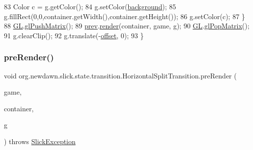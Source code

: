 \begin{DoxyCode}
83             Color c = g.getColor();
84             g.setColor(\mbox{\hyperlink{classorg_1_1newdawn_1_1slick_1_1state_1_1transition_1_1_horizontal_split_transition_a9f2e988c706773e93ad1472d85c5b229}{background}});
85             g.fillRect(0,0,container.getWidth(),container.getHeight());
86             g.setColor(c);
87         \}
88         \mbox{\hyperlink{classorg_1_1newdawn_1_1slick_1_1state_1_1transition_1_1_horizontal_split_transition_aaceecb1455b0610ec5366dda0247bcce}{GL}}.\mbox{\hyperlink{interfaceorg_1_1newdawn_1_1slick_1_1opengl_1_1renderer_1_1_s_g_l_ae9904a980aa014796bf1dcd748b63056}{glPushMatrix}}();
89         \mbox{\hyperlink{classorg_1_1newdawn_1_1slick_1_1state_1_1transition_1_1_horizontal_split_transition_a07a49cfa318899ffe21df13886c4f9f3}{prev}}.\mbox{\hyperlink{interfaceorg_1_1newdawn_1_1slick_1_1state_1_1_game_state_a065352d2725274c5244cd022f226eb17}{render}}(container, game, g);
90         \mbox{\hyperlink{classorg_1_1newdawn_1_1slick_1_1state_1_1transition_1_1_horizontal_split_transition_aaceecb1455b0610ec5366dda0247bcce}{GL}}.\mbox{\hyperlink{interfaceorg_1_1newdawn_1_1slick_1_1opengl_1_1renderer_1_1_s_g_l_ab8fd54b37e504c0b72d8b18b90c94c41}{glPopMatrix}}();
91         g.clearClip();
92         g.translate(-\mbox{\hyperlink{classorg_1_1newdawn_1_1slick_1_1state_1_1transition_1_1_horizontal_split_transition_a7abff0f1ccb7041c5a0964ee3f06abec}{offset}}, 0);
93     \}
\end{DoxyCode}
\mbox{\label{classorg_1_1newdawn_1_1slick_1_1state_1_1transition_1_1_horizontal_split_transition_af1ca23f69b349c5be7c0ea2dccb9545b}} 
\subsubsection{\texorpdfstring{pre\+Render()}{preRender()}}
{\footnotesize\ttfamily void org.\+newdawn.\+slick.\+state.\+transition.\+Horizontal\+Split\+Transition.\+pre\+Render (\begin{DoxyParamCaption}\item[{\mbox{\hyperlink{classorg_1_1newdawn_1_1slick_1_1state_1_1_state_based_game}{State\+Based\+Game}}}]{game,  }\item[{\mbox{\hyperlink{classorg_1_1newdawn_1_1slick_1_1_game_container}{Game\+Container}}}]{container,  }\item[{\mbox{\hyperlink{classorg_1_1newdawn_1_1slick_1_1_graphics}{Graphics}}}]{g }\end{DoxyParamCaption}) throws \mbox{\hyperlink{classorg_1_1newdawn_1_1slick_1_1_slick_exception}{Slick\+Exception}}\hspace{0.3cm}{\ttfamily [inline]}}

